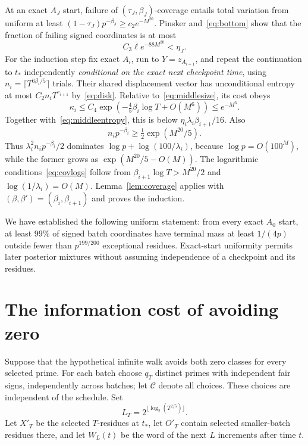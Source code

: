 \documentclass[11pt]{article}
\numberwithin{equation}{section}
\theoremstyle{definition}\newtheorem{definition}[theorem]{Definition}
\theoremstyle{remark}\newtheorem{remark}[theorem]{Remark}
\newcommand{\Lb}{\overline{\ell}}
\begin{document}
At an exact $A_J$ start, failure of $(\tau_J,\beta_J)$-coverage entails total variation from uniform at least $(1-\tau_J)p^{-\beta_J}\ge c_2e^{-M^{20}}$. Pinsker and~\eqref{eq:bottom} show that the fraction of failing signed coordinates is at most
\[
 C_3\Lb e^{-88M^{20}}<\eta_J.
\]
For the induction step fix exact $A_i$, run to $Y=z_{A_{i+1}}$, and repeat the continuation to $t_*$ independently \emph{conditional on the exact next checkpoint time}, using
$n_i=\lceil T^{6\beta_i/5}\rceil$ trials. Their shared displacement vector has unconditional entropy at most $C_2n_iT^{r_{i+1}}$ by~\eqref{eq:disk}. Relative to~\eqref{eq:middlesize}, its cost obeys
\[
 \kappa_i\le C_4\exp\left(-\tfrac45\beta_i\log T+O(M^6)\right)
 \le e^{-M^3}.
\]
Together with~\eqref{eq:middleentropy}, this is below
$\eta_i\lambda_i\beta_{i+1}/16$. Also
\[
 n_ip^{-\beta_i}\ge\tfrac12\exp(M^{20}/5).
\]
Thus $\lambda_i^2n_ip^{-\beta_i}/2$ dominates $\log p+\log(100/\lambda_i)$, because $\log p=O(100^M)$, while the former grows as $\exp(M^{20}/5-O(M))$. The logarithmic conditions~\eqref{eq:covlogs} follow from
$\beta_{i+1}\log T>M^{20}/2$ and $\log(1/\lambda_i)=O(M)$. Lemma~\ref{lem:coverage} applies with $(\beta,\beta')=(\beta_i,\beta_{i+1})$ and proves the induction.

We have established the following uniform statement: from every exact $A_0$ start, at least $99\%$ of signed batch coordinates have terminal mass at least $1/(4p)$ outside fewer than $p^{199/200}$ exceptional residues. Exact-start uniformity permits later posterior mixtures without assuming independence of a checkpoint and its residues.

\section{The information cost of avoiding zero}\label{sec:cost}

Suppose that the hypothetical infinite walk avoids both zero classes for every selected prime. For each batch choose $q_T$ distinct primes with independent fair signs, independently across batches; let $\mathcal C$ denote all choices. These choices are independent of the schedule. Set
\[
 L_T=2^{\lfloor\log_2(T^{2/5})\rfloor}.
\]
Let $X'_T$ be the selected $T$-residues at $t_*$, let $O'_T$ contain selected smaller-batch residues there, and let $W_L(t)$ be the word of the next $L$ increments after time $t$.
\end{document}
